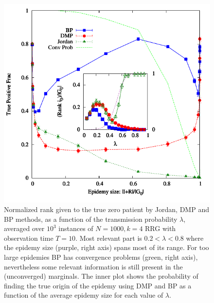 


\begin{figure}
\includegraphics[width=1\columnwidth, angle=0]{zero_patient/T11_rank_vs_lambda_mu05}
\caption{\label{fig:rank_vs_lambda_T11_mu05} Normalized rank given to the true zero patient by Jordan, DMP and BP methods, as a function of the transmission probability $\lambda$, averaged over $10^3$ instances of $N=1000, k=4$ RRG with observation time $T=10$. Most relevant part is $0.2<\lambda<0.8$ where the epidemy size (purple, right axis) spans most of its range. For too large epidemies BP has convergence problems (green, right axis), nevertheless some relevant information is still present in the (unconverged) marginals. The inner plot shows the probability of finding the true origin of the epidemy using DMP and BP as a function of the average epidemy size for each value of $\lambda$.}
\end{figure}




